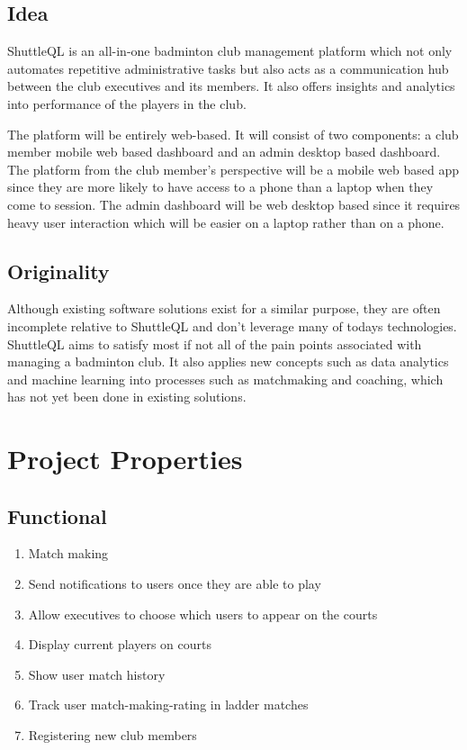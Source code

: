 \documentclass{article}
\begin{document}
\subsection{Idea}
ShuttleQL is an all-in-one badminton club management platform which not only
automates repetitive administrative tasks but also acts as a communication hub
between the club executives and its members. It also offers insights and
analytics into performance of the players in the club.

The platform will be entirely web-based. It will consist of two components:
a club member mobile web based dashboard and an admin desktop based dashboard.
The platform from the club member's perspective will be a mobile web based app
since they are more likely to have access to a phone than a laptop when they
come to session. The admin dashboard will be web desktop based since it requires
heavy user interaction which will be easier on a laptop rather than on a phone.

\subsection{Originality}
Although existing software solutions exist for a similar purpose, they are often
incomplete relative to ShuttleQL and don't leverage many of todays technologies.
ShuttleQL aims to satisfy most if not all of the pain points associated with
managing a badminton club. It also applies new concepts such as data analytics and
machine learning into processes such as matchmaking and coaching, which has not
yet been done in existing solutions.

\newpage

\section{Project Properties}
\subsection{Functional}
\begin{enumerate}
  \item Match making
  \item Send notifications to users once they are able to play
  \item Allow executives to choose which users to appear on the courts
  \item Display current players on courts
  \item Show user match history
  \item Track user match-making-rating in ladder matches
  \item Registering new club members
\end{enumerate}
\end{document}
